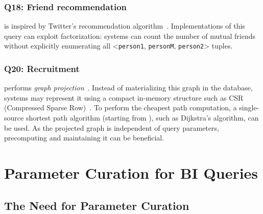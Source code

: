 \subsubsection{Q18: Friend recommendation}

 is inspired by Twitter's recommendation algorithm~\cite{DBLP:conf/www/GuptaGLSWZ13}.
Implementations of this query can exploit factorization:
systems can count the number of mutual friends without explicitly enumerating all
\textsf{<}\texttt{person1}, \texttt{personM}, \texttt{person2}\textsf{>} tuples.

\subsubsection{Q20: Recruitment}

 performs \emph{graph projection}~\cite{DBLP:conf/sigmod/AnglesABBFGLPPS18}.
Instead of materializing this graph in the database,
systems may represent it using a compact in-memory structure such as CSR (Compressed Sparse Row)~\cite{DBLP:books/daglib/0009092}.
To perform the cheapest path computation, a single-source shortest path algorithm
(starting from ), such as Dijkstra's algorithm, can be used.
As the projected graph %
is independent of query parameters, precomputing and maintaining it can be beneficial.



\section{Parameter Curation for BI Queries}
\label{sec:paramgen}

\subsection{The Need for Parameter Curation}


